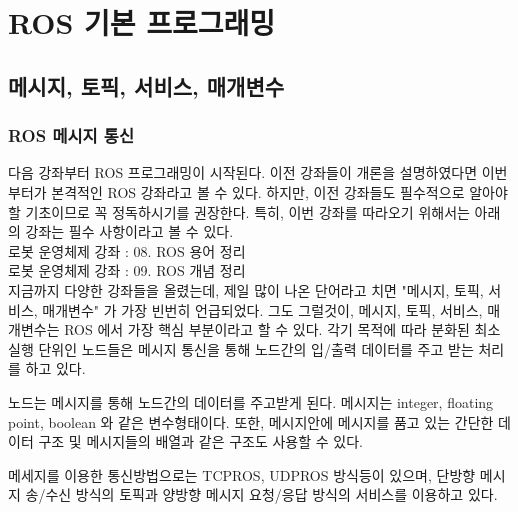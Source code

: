 
\chapter{ROS 기본 프로그래밍}

\section{메시지, 토픽, 서비스, 매개변수}

\subsection{ROS 메시지 통신}

다음 강좌부터 ROS 프로그래밍이 시작된다. 이전 강좌들이 개론을 설명하였다면 이번 부터가 본격적인 ROS 강좌라고 볼 수 있다. 하지만, 이전 강좌들도 필수적으로 알아야할 기초이므로 꼭 정독하시기를 권장한다. 특히, 이번 강좌를 따라오기 위해서는 아래의 강좌는 필수 사항이라고 볼 수 있다.\\

로봇 운영체제 강좌 : 08. ROS 용어 정리\\
로봇 운영체제 강좌 : 09. ROS 개념 정리\\

지금까지 다양한 강좌들을 올렸는데, 제일 많이 나온 단어라고 치면 "메시지, 토픽, 서비스, 매개변수" 가 가장 빈번히 언급되었다. 그도 그럴것이, 메시지, 토픽, 서비스, 매개변수는 ROS 에서 가장 핵심 부분이라고 할 수 있다. 각기 목적에 따라 분화된 최소 실행 단위인 노드들은 메시지 통신을 통해 노드간의 입/출력 데이터를 주고 받는 처리를 하고 있다.

\begin{definition*}
노드는 메시지를 통해 노드간의 데이터를 주고받게 된다. 메시지는 integer, floating point, boolean 와 같은 변수형태이다. 또한, 메시지안에 메시지를 품고 있는 간단한 데이터 구조 및 메시지들의 배열과 같은 구조도 사용할 수 있다. 

메세지를 이용한 통신방법으로는 TCPROS, UDPROS 방식등이 있으며, 단방향 메시지 송/수신 방식의 토픽과 양방향 메시지 요청/응답 방식의 서비스를 이용하고 있다.
\end{definition*}

